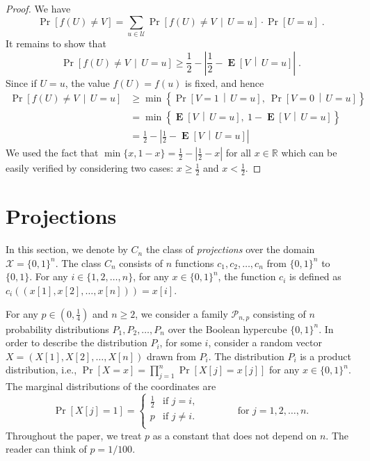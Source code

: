 \documentclass[10pt]{article}
\newcommand{\R}{\mathbb{R}}
\renewcommand{\P}{\mathcal{P}}
\newcommand{\U}{\mathcal{U}}
\newcommand{\X}{\mathcal{X}}
\DeclareMathOperator{\Exp}{\mathbf{E}}
\begin{document}
\begin{proof}
We have
$$
\Pr \left[ f(U) \neq V \right] = \sum_{u \in \U} \Pr \left[ f(U) \neq V \, \middle| \, U = u \right] \cdot \Pr[U = u] \; .
$$
It remains to show that
$$
\Pr\left[ f(U) \neq V \, \middle| \, U = u \right]
\ge
\frac{1}{2} - \left| \frac{1}{2} -  \Exp \left[V \, \middle| \, U = u \right] \right| \; .
$$
Since if  $U=u$, the value $f(U) = f(u)$ is fixed, and hence
\begin{align*}
\Pr\left[ f(U) \neq V \, \middle| \, U = u \right]
& \ge \min\left\{ \Pr \left[ V = 1 \, \middle| \, U = u \right], \ \Pr \left[ V = 0 \, \middle| \, U = u \right] \right\} \\
& = \min\left\{ \Exp \left[ V  \, \middle| \, U = u \right], \ 1 - \Exp \left[ V \, \middle| \, U = u \right] \right\} \\
& = \frac{1}{2} - \left| \frac{1}{2} -  \Exp \left[ V  \, \middle| \, U = u \right] \right|
\end{align*}
We used the fact that $\min\{x, 1 - x\} = \frac{1}{2} - \left| \frac{1}{2} - x \right|$ for all $x \in \R$
which can be easily verified by considering two cases: $x \ge \frac{1}{2}$ and $x < \frac{1}{2}$.
\end{proof}



\section{Projections}

In this section, we denote by $C_n$ the class of \emph{projections} over the
domain $\X = \{0,1\}^n$. The class $C_n$ consists of $n$ functions $c_1, c_2,
\dots, c_n$ from $\{0,1\}^n$ to $\{0,1\}$. For any $i \in \{1,2,\dots,n\}$, for
any $x \in \{0,1\}^n$, the function $c_i$ is defined as $c_i((x[1], x[2], \dots,
x[n])) = x[i]$.

For any $p \in (0,\frac{1}{4})$ and $n \ge 2$, we consider a family $\P_{n,p}$
consisting of $n$ probability distributions $P_1, P_2, \dots, P_n$ over the
Boolean hypercube $\{0,1\}^n$. In order to describe the distribution $P_i$, for
some $i$, consider a random vector $X = (X[1], X[2], \dots, X[n])$ drawn from
$P_i$. The distribution $P_i$ is a product distribution, i.e., $\Pr[X = x] =
\prod_{j=1}^n \Pr[X[j] = x[j]]$ for any $x \in \{0,1\}^n$. The marginal
distributions of the coordinates are
$$
\Pr[X[j] = 1] =
\begin{cases}
\frac{1}{2} & \text{if $j = i$,} \\
p & \text{if $j\neq i$.} \\
\end{cases}
\qquad \qquad \text{for $j=1,2,\dots,n$.}
$$
Throughout the paper, we treat $p$ as a constant that does not depend
on $n$. The reader can think of $p=1/100$.
\end{document}

